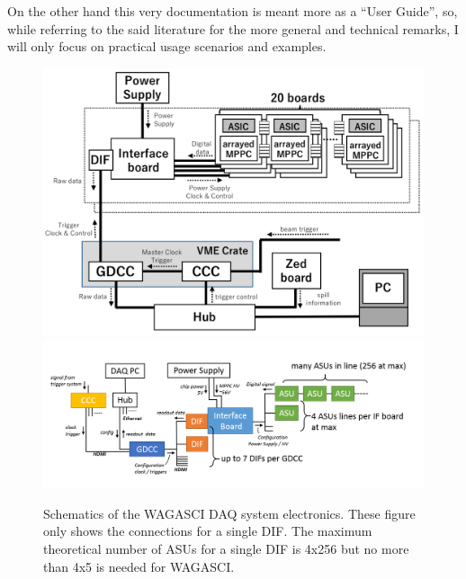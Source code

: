 On the other hand this very documentation is meant more as a ``User Guide'', so,
while referring to the said literature for the more general and technical
remarks, I will only focus on practical usage scenarios and examples.
\begin{figure}[ht]
  \centering \includegraphics[width=0.7\linewidth]{DAQ-schematics-1} \\
  \includegraphics[width=0.7\linewidth]{DAQ-schematics-2}
  \caption{Schematics of the WAGASCI DAQ system electronics. These figure only
    shows the connections for a single DIF. The maximum theoretical number of
    ASUs for a single DIF is 4x256 but no more than 4x5 is needed for
    WAGASCI.}\label{DAQ-schematics}
\end{figure}


